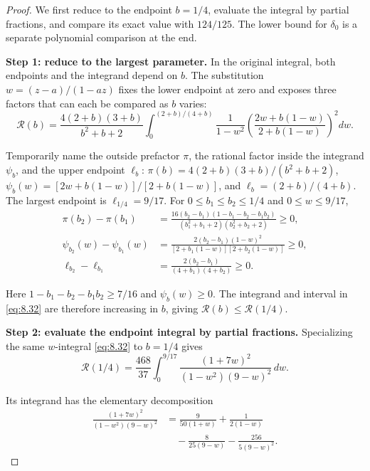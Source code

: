 \begin{proof}
We first reduce to the endpoint $b=1/4$, evaluate the integral by
partial fractions, and compare its exact value with $124/125$.
The lower bound for $\delta_0$ is a separate polynomial comparison at the end.

\textbf{Step 1: reduce to the largest parameter.} In the original integral, both
endpoints and the integrand depend on $b$. The substitution
$w=(z-a)/(1-az)$ fixes the lower endpoint at zero and exposes three factors
that can each be compared as $b$ varies:
\begin{equation}\label{eq:8.32}
\mathcal R(b)=\frac{4(2+b)(3+b)}{b^2+b+2}
\int_0^{(2+b)/(4+b)}\frac1{1-w^2}
\left(\frac{2w+b(1-w)}{2+b(1-w)}\right)^2dw.
\end{equation}

Temporarily name the outside prefactor $\pi$, the rational factor inside the
integrand $\psi_b$, and the upper endpoint $\ell_b$:
$\pi(b)=4(2+b)(3+b)/(b^2+b+2)$,
$\psi_b(w)=[2w+b(1-w)]/[2+b(1-w)]$, and
$\ell_b=(2+b)/(4+b)$. The largest endpoint is $\ell_{1/4}=9/17$.
For $0\le b_1\le b_2\le1/4$ and $0\le w\le9/17$,
\begin{equation}\label{eq:8.33}
\begin{aligned}
\pi(b_2)-\pi(b_1)
&=\frac{16(b_2-b_1)(1-b_1-b_2-b_1b_2)}
{(b_1^2+b_1+2)(b_2^2+b_2+2)}\ge0,\\
\psi_{b_2}(w)-\psi_{b_1}(w)
&=\frac{2(b_2-b_1)(1-w)^2}
{[2+b_1(1-w)][2+b_2(1-w)]}\ge0,\\
\ell_{b_2}-\ell_{b_1}
&=\frac{2(b_2-b_1)}{(4+b_1)(4+b_2)}\ge0.
\end{aligned}
\end{equation}

Here $1-b_1-b_2-b_1b_2\ge7/16$ and $\psi_b(w)\ge0$. The integrand and interval in \eqref{eq:8.32} are therefore increasing in $b$, giving
$\mathcal R(b)\le\mathcal R(1/4)$.

\textbf{Step 2: evaluate the endpoint integral by partial fractions.}
Specializing the same $w$-integral \eqref{eq:8.32} to $b=1/4$ gives
\begin{equation}\label{eq:8.34}
\mathcal R(1/4)=\frac{468}{37}
\int_0^{9/17}\frac{(1+7w)^2}{(1-w^2)(9-w)^2}\,dw.
\end{equation}

Its integrand has the elementary decomposition
\begin{equation}\label{eq:8.35}
\begin{aligned}
\frac{(1+7w)^2}{(1-w^2)(9-w)^2}
&=\frac{9}{50(1+w)}+\frac{1}{2(1-w)}\\
&\quad-\frac{8}{25(9-w)}-\frac{256}{5(9-w)^2}.
\end{aligned}
\end{equation}


\end{proof}
